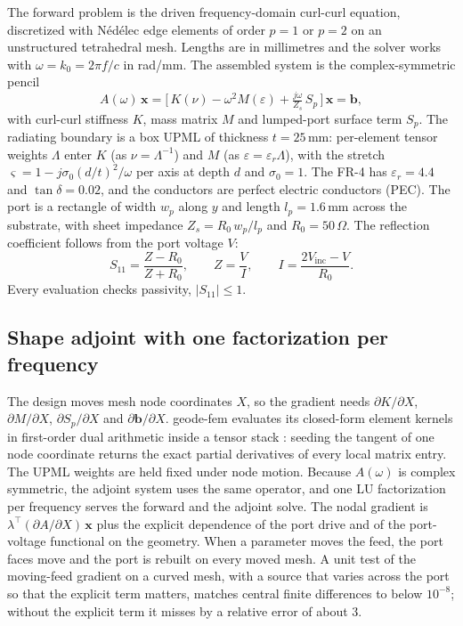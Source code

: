 \documentclass{anvil-paper}
\begin{document}
The forward problem is the driven frequency-domain curl-curl equation,
discretized with N\'ed\'elec edge elements of order $p = 1$ or $p = 2$ on an
unstructured tetrahedral mesh. Lengths are in millimetres and the solver
works with $\omega = k_0 = 2\pi f/c$ in rad/mm. The assembled system is the
complex-symmetric pencil
\begin{equation}
  A(\omega)\,\mathbf{x}
  = \Big[\,K(\nu) - \omega^2 M(\varepsilon) + \tfrac{j\omega}{Z_s}\,S_p\,\Big]\,\mathbf{x}
  = \mathbf{b},
  \label{eq:pencil}
\end{equation}
with curl-curl stiffness $K$, mass matrix $M$ and lumped-port surface term
$S_p$. The radiating boundary is a box UPML of thickness $t = 25$\,mm:
per-element tensor weights $\Lambda$ enter $K$ (as $\nu = \Lambda^{-1}$) and
$M$ (as $\varepsilon = \varepsilon_r \Lambda$), with the stretch
$\varsigma = 1 - j\sigma_0 (d/t)^2/\omega$ per axis at depth $d$ and
$\sigma_0 = 1$. The FR-4 has $\varepsilon_r = 4.4$ and $\tan\delta = 0.02$,
and the conductors are perfect electric conductors (PEC). The port is a
rectangle of width $w_p$ along $y$ and length $l_p = 1.6$\,mm across the
substrate, with sheet impedance $Z_s = R_0\,w_p/l_p$ and $R_0 = 50\,\Omega$.
The reflection coefficient follows from the port voltage $V$:
\begin{equation}
  S_{11} = \frac{Z - R_0}{Z + R_0},\qquad Z = \frac{V}{I},\qquad
  I = \frac{2V_{\mathrm{inc}} - V}{R_0}.
  \label{eq:s11}
\end{equation}
Every evaluation checks passivity, $|S_{11}| \le 1$.

\subsection{Shape adjoint with one factorization per frequency}
\label{sec:adjoint}

The design moves mesh node coordinates $X$, so the gradient needs
$\partial K/\partial X$, $\partial M/\partial X$, $\partial S_p/\partial X$
and $\partial \mathbf{b}/\partial X$. geode-fem evaluates its closed-form
element kernels in first-order dual arithmetic inside a tensor stack
\citep{burn}: seeding the tangent of one
node coordinate returns the exact partial derivatives of every local matrix
entry. The UPML weights are held fixed under node motion. Because $A(\omega)$
is complex symmetric, the adjoint system uses the same operator, and one LU
factorization per frequency serves the forward and the adjoint solve. The
nodal gradient is $\lambda^{\top}(\partial A/\partial X)\,\mathbf{x}$ plus the
explicit dependence of the port drive and of the port-voltage functional on
the geometry. When a parameter moves the feed, the port faces move and the
port is rebuilt on every moved mesh. A unit test of the moving-feed gradient
on a curved mesh, with a source that varies across the port so that the
explicit term matters, matches central finite differences to below
$10^{-8}$; without the explicit term it misses by a relative error of about 3.
\end{document}
